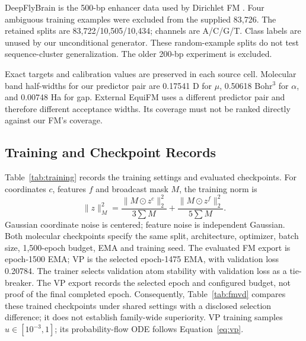 \documentclass{article}
\begin{document}
DeepFlyBrain is the 500-bp enhancer data used by Dirichlet FM \citep{stark2024dirichlet}. Four ambiguous training examples were excluded from the supplied 83,726. The retained splits are 83,722/10,505/10,434; channels are A/C/G/T. Class labels are unused by our unconditional generator. These random-example splits do not test sequence-cluster generalization. The older 200-bp experiment is excluded.

Exact targets and calibration values are preserved in each source cell. Molecular band half-widths for our predictor pair are 0.17541 D for $\mu$, 0.50618 Bohr$^3$ for $\alpha$, and 0.00748 Ha for gap. External EquiFM uses a different predictor pair and therefore different acceptance widths. Its coverage must not be ranked directly against our FM's coverage.

\subsection{Training and Checkpoint Records}\label{app:training}
Table~\ref{tab:training} records the training settings and evaluated checkpoints. For coordinates $c$, features $f$ and broadcast mask $M$, the training norm is
\[
\|z\|_M^2=\frac{\|M\odot z^c\|_2^2}{3\sum M}+\frac{\|M\odot z^f\|_2^2}{5\sum M}.
\]
Gaussian coordinate noise is centered; feature noise is independent Gaussian. Both molecular checkpoints specify the same split, architecture, optimizer, batch size, 1,500-epoch budget, EMA and training seed. The evaluated FM export is epoch-1500 EMA; VP is the selected epoch-1475 EMA, with validation loss 0.20784. The trainer selects validation atom stability with validation loss as a tie-breaker. The VP export records the selected epoch and configured budget, not proof of the final completed epoch. Consequently, Table~\ref{tab:fmvd} compares these trained checkpoints under shared settings with a disclosed selection difference; it does not establish family-wide superiority. VP training samples $u\in[10^{-3},1]$; its probability-flow ODE follows Equation~\eqref{eq:vp}.
\end{document}
